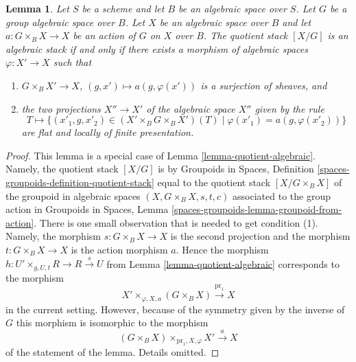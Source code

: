 \documentclass{stacks-project}
\theoremstyle{plain}
\newtheorem{lemma}[subsection]{Lemma}
\theoremstyle{definition}
\theoremstyle{remark}
\numberwithin{equation}{subsection}
\begin{document}
\begin{lemma}
\label{lemma-group-quotient-algebraic}
Let $S$ be a scheme and let $B$ be an algebraic space over $S$.
Let $G$ be a group algebraic space over $B$.
Let $X$ be an algebraic space over $B$ and let $a : G \times_B X \to X$
be an action of $G$ on $X$ over $B$.
The quotient stack $[X/G]$ is an algebraic stack if and only if
there exists a morphism of algebraic spaces $\varphi : X' \to X$ such that
\begin{enumerate}
\item $G \times_B X' \to X$, $(g, x') \mapsto a(g, \varphi(x'))$ is a
surjection of sheaves, and
\item the two projections $X'' \to X'$ of the algebraic space $X''$
given by the rule
$$
T \longmapsto \{(x'_1, g, x'_2) \in (X' \times_B G \times_B X')(T)
\mid \varphi(x'_1) = a(g, \varphi(x'_2))\}
$$
are flat and locally of finite presentation.
\end{enumerate}
\end{lemma}

\begin{proof}
This lemma is a special case of
Lemma \ref{lemma-quotient-algebraic}.
Namely, the quotient stack $[X/G]$ is by
Groupoids in Spaces, Definition \ref{spaces-groupoids-definition-quotient-stack}
equal to the quotient stack $[X/G \times_B X]$ of the groupoid in
algebraic spaces $(X, G \times_B X, s, t, c)$ associated to
the group action in
Groupoids in Spaces, Lemma \ref{spaces-groupoids-lemma-groupoid-from-action}.
There is one small observation that is needed to get condition (1).
Namely, the morphism $s : G \times_B X \to X$ is the second projection
and the morphism $t :  G \times_B X \to X$ is the action morphism $a$.
Hence the morphism $h : U' \times_{g, U, t} R \to R \xrightarrow{s} U$ from
Lemma \ref{lemma-quotient-algebraic}
corresponds to the morphism
$$
X' \times_{\varphi, X, a} (G \times_B X) \xrightarrow{\text{pr}_1} X
$$
in the current setting. However, because of the symmetry given by
the inverse of $G$ this morphism is isomorphic to the morphism
$$
(G \times_B X) \times_{\text{pr}_1, X, \varphi} X' \xrightarrow{a} X
$$
of the statement of the lemma. Details omitted.
\end{proof}
\end{document}

